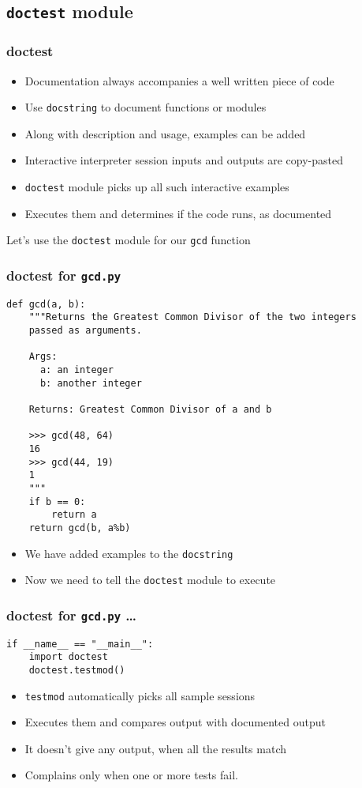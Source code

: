 \documentclass[12pt,presentation]{beamer}
\begin{document}
\subsection{\texttt{doctest} module}

\begin{frame}[fragile]
  \frametitle{doctest}
  \begin{itemize}
  \item Documentation always accompanies a well written piece of code
  \item Use \texttt{docstring} to document functions or modules
  \item Along with description and usage, examples can be added
  \item Interactive interpreter session inputs and outputs are
    copy-pasted 
  \item \texttt{doctest} module picks up all such interactive examples
  \item Executes them and determines if the code runs, as documented
  \end{itemize}
  Let's use the \texttt{doctest} module for our \texttt{gcd} function
\end{frame}


\begin{frame}[fragile]
  \frametitle{doctest for \texttt{gcd.py}}
\begin{tiny}
\begin{lstlisting}
def gcd(a, b):
    """Returns the Greatest Common Divisor of the two integers
    passed as arguments.

    Args:
      a: an integer
      b: another integer

    Returns: Greatest Common Divisor of a and b

    >>> gcd(48, 64)
    16
    >>> gcd(44, 19)
    1
    """
    if b == 0:
        return a
    return gcd(b, a%b) 
\end{lstlisting}
\end{tiny}
\begin{itemize}
\item We have added examples to the \texttt{docstring}
\item Now we need to tell the \texttt{doctest} module to execute
\end{itemize}
\end{frame}

\begin{frame}[fragile]
  \frametitle{doctest for \texttt{gcd.py} \ldots}
\begin{lstlisting}
if __name__ == "__main__":
    import doctest
    doctest.testmod()
\end{lstlisting}
\begin{itemize}
\item \texttt{testmod} automatically picks all sample sessions
\item Executes them and compares output with documented output
\item It doesn't give any output, when all the results match 
\item Complains only when one or more tests fail. 
\end{itemize}
\end{frame}
\end{document}
